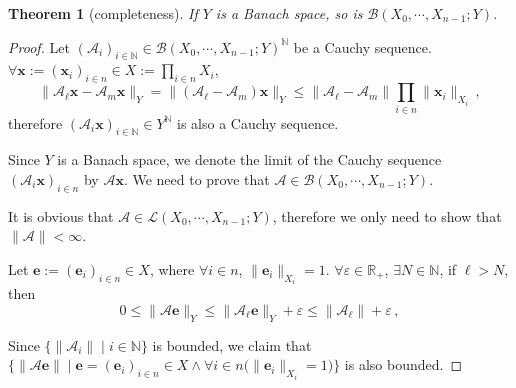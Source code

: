 \documentclass[openany]{book}
\theoremstyle{plain}
\newtheorem{theorem}{Theorem}[section] %
\theoremstyle{definition}
\newcommand*{\bv}{\boldsymbol} %
\begin{document}
\begin{theorem}[completeness]
	If $Y$ is a Banach space, so is $\mathcal B(X_0, \cdots, X_{n-1}; Y)$.
\end{theorem}
\begin{proof}
	Let $(\mathscr A_i)_{i \in \mathbb N} \in \mathcal B(X_0, \cdots, X_{n-1}; Y)^{\mathbb N}$ be a Cauchy sequence. 
	$\forall \bv x := (\bv x_i)_{i \in n} \in X := \prod_{i \in n} X_i$, 
	\begin{equation*}
		\|\mathscr A_\ell \bv x - \mathscr A_m \bv x\|_Y
		= \|(\mathscr A_\ell - \mathscr A_m) \bv x\|_Y
		\leq \|\mathscr A_\ell - \mathscr A_m\| \prod_{i \in n} \|\bv x_i\|_{X_i}
		\,,
	\end{equation*}
	therefore $(\mathscr A_i \bv x)_{i \in \mathbb N} \in Y^\mathbb N$ is also a Cauchy sequence.

	Since $Y$ is a Banach space, we denote the limit of the Cauchy sequence $(\mathscr A_i \bv x)_{i \in n}$ by $\mathscr A \bv x$. 
	We need to prove that $\mathscr A \in \mathcal B(X_0, \cdots, X_{n-1}; Y)$.

	It is obvious that $\mathscr A \in \mathcal L(X_0, \cdots, X_{n-1}; Y)$, therefore we only need to show that $\|\mathscr A\| < \infty$.

	Let $\bv e := (\bv e_i)_{i \in n} \in X$, where $\forall i \in n$, $\|\bv e_i\|_{X_i} = 1$. 
	$\forall \varepsilon \in \mathbb R_+$, $\exists N \in \mathbb N$, if $\ell > N$, then
	\begin{equation*}
		0 \leq \|\mathscr A \bv e\|_Y
			\leq \|\mathscr A_\ell \bv e\|_Y + \varepsilon
			\leq \|\mathscr A_\ell\| + \varepsilon\,, 
	\end{equation*} 

	Since $\{\|\mathscr A_i\| \mid i \in \mathbb N\}$ is bounded, we claim that $\big\{\|\mathscr A \bv e\| \mid \bv e = (\bv e_i)_{i \in n} \in X \wedge \forall i \in n \big( \|\bv e_i\|_{X_i} = 1\big)\big\}$ is also bounded.
\end{proof}
\end{document}
